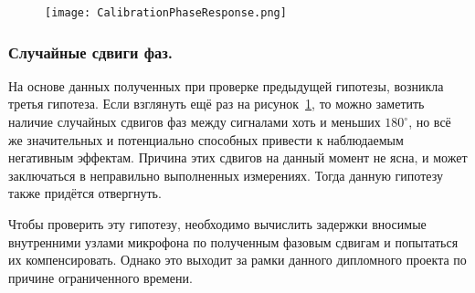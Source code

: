 \begin{figure}[ht]
	\centering
	\texttt{[image: CalibrationPhaseResponse.png]}  
	\caption{}
	\label{fig:CalibrationPhaseResponse}
\end{figure}

\subsubsection{Случайные сдвиги фаз. }
На основе данных полученных при проверке предыдущей гипотезы, возникла третья гипотеза. Если взглянуть ещё раз на рисунок~\ref{fig:CalibrationPhaseResponse}, то можно заметить наличие случайных сдвигов фаз между сигналами хоть и меньших $180^{\circ}$, но всё же значительных и потенциально способных привести к наблюдаемым негативным эффектам. Причина этих сдвигов на данный момент не ясна, и может заключаться в неправильно выполненных измерениях. Тогда данную гипотезу также придётся отвергнуть.

Чтобы проверить эту гипотезу, необходимо вычислить задержки вносимые внутренними узлами микрофона по полученным фазовым сдвигам и попытаться их компенсировать. Однако это выходит за рамки данного дипломного проекта по причине ограниченного времени.